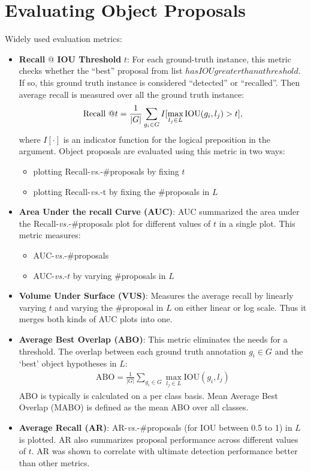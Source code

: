 \documentclass[10pt]{article}
\begin{document}
\section{Evaluating Object Proposals}%
\label{sec:protocols}
Widely used evaluation metrics:
%
\begin{itemize}
  \item \textbf{Recall} @ \textbf{IOU Threshold} $t$: For each ground-truth
    instance, this metric checks whether the ``best'' proposal from list $
    has IOU greater than a threshold $. If so, this ground truth instance is
    considered ``detected'' or ``recalled''. Then average recall is measured
    over all the ground truth instance:
    \begin{align}
      \setcounter{equation}{1}
      \label{eq:2}
      \text{Recall @} t = \frac{1}{\vert G \vert} \sum_{g_i \in G} I[\max_{l_j \in L} \text{IOU}(g_i, l_j) > t], 
    \end{align}
    where $I[\cdot]$ is an indicator function for the logical preposition in
    the argument. Object proposals are evaluated using this metric in two ways:
    \begin{itemize}
      \item plotting Recall-\textit{vs.}-\#proposals by fixing $t$
      \item plotting Recall-\textit{vs.}-t by fixing the \#proposals in $L$
    \end{itemize}
  \item \textbf{Area Under the recall Curve (AUC)}: AUC summarized the area
    under the Recall-\textit{vs.}-\#proposals plot for different values of $t$
    in a single plot. This metric measures:
    \begin{itemize}
      \item AUC-\textit{vs.}-\#proposals
      \item AUC-\textit{vs.}-$t$ by varying \#proposals in $L$
    \end{itemize}
  \item \textbf{Volume Under Surface (VUS)}: Measures the average recall by
    linearly varying $t$ and varying the \#proposal in $L$ on either linear or
    log scale. Thus it merges both kinds of AUC plots into one.
  \item \textbf{Average Best Overlap (ABO)}: This metric eliminates the needs
    for a threshold. The overlap between each ground truth annotation
    $g_i \in G$ and the `best' object hypotheses in $L$:
    \begin{align}
      \label{eq:3}
      \text{ABO} = \frac{1}{\vert G \vert} \sum_{g_i \in G} \max_{l_j \in L} \text{IOU}(g_i, l_j)
    \end{align}
    ABO is typically is calculated on a per class basis. Mean Average Best
    Overlap (MABO) is defined as the mean ABO over all classes.
  \item \textbf{Average Recall (AR)}: AR-\textit{vs.}-\#proposals (for IOU
    between 0.5 to 1) in $L$ is plotted. AR also summarizes proposal
    performance across different values of $t$. AR was shown to correlate with
    ultimate detection performance better than other metrics.
\end{itemize}
\end{document}
